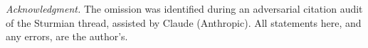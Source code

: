 \documentclass[10pt]{article}
\begin{document}

\medskip\noindent\emph{Acknowledgment.} The omission was identified during an adversarial citation audit of
the Sturmian thread, assisted by Claude (Anthropic). All statements here, and any errors, are the
author's.

{\footnotesize


}
\end{document}
